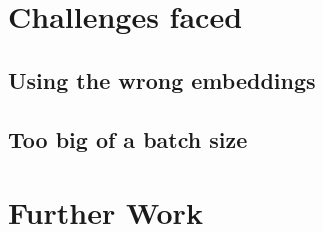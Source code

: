 \section{Challenges faced}
\subsection{Using the wrong embeddings}
\subsection{Too big of a batch size}
\section{Further Work}